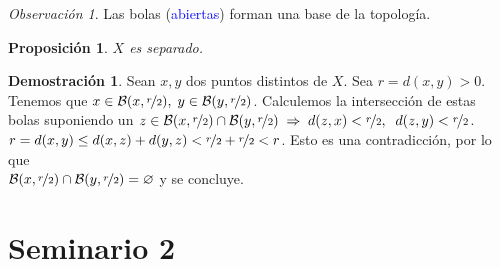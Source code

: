 \documentclass[12pt,twoside]{report}
\newcommand\mc[1]{\mathcal{#1}}
\theoremstyle{azul}
\theoremstyle{azul2}
\theoremstyle{plain}
\newtheorem*{prop}{Proposición}
\theoremstyle{definition}
\newtheorem*{dem}{Demostración}
\theoremstyle{remark}
\newtheorem*{obs}{Observación}
\begin{document}
\begin{obs}
Las bolas (\textcolor{blue}{abiertas}) forman una base de la topología.
\end{obs}
\vspace{5mm}
\begin{prop}
$X$ es separado.
\end{prop}
\begin{dem}
Sean $x,y$ dos puntos distintos de $X$. Sea $r = d(x,y) > 0$.\\
Tenemos que $x \in \mc{B}(x,\nicefrac{r}{2}),\; y \in \mc{B}(y,\nicefrac{r}{2})$. Calculemos la intersección de estas bolas suponiendo un $z \in \mc{B}(x,\nicefrac{r}{2}) \cap \mc{B}(y,\nicefrac{r}{2})\; \Rightarrow \; d(z,x) < \nicefrac{r}{2}, \;\; d(z,y) < \nicefrac{r}{2}$.\\
$r = d(x,y) \leq d(x,z) + d(y,z) < \nicefrac{r}{2} + \nicefrac{r}{2} < r$. Esto es una contradicción, por lo que \\$\mc{B}(x,\nicefrac{r}{2}) \cap \mc{B}(y,\nicefrac{r}{2}) = \varnothing$ y se concluye.
\end{dem}



\section{Seminario 2}
\end{document}

